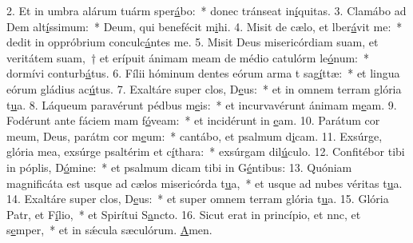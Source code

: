 2. Et in umbra alárum tuárm sper\uline{á}bo:~* donec tránseat in\uline{í}quitas.
3. Clamábo ad Dem alt\uline{í}ssimum:~* Deum, qui benefécit m\uline{i}hi.
4. Misit de cælo, et lber\uline{á}vit me:~* dedit in oppróbrium conculc\uline{á}ntes me.
5. Misit Deus misericórdiam suam, et veritátem suam,~† et erípuit ánimam meam de médio catulórm le\uline{ó}num:~* dormívi conturb\uline{á}tus.
6. Fílii hóminum dentes eórum arma t sag\uline{í}ttæ:~* et lingua eórum gládius ac\uline{ú}tus.
7. Exaltáre super clos, D\uline{e}us:~* et in omnem terram glória t\uline{u}a.
8. Láqueum paravérunt pédbus m\uline{e}is:~* et incurvavérunt ánimam m\uline{e}am.
9. Fodérunt ante fáciem mam f\uline{ó}veam:~* et incidérunt in \uline{e}am.
10. Parátum cor meum, Deus, parátm cor m\uline{e}um:~* cantábo, et psalmum d\uline{i}cam.
11. Exsúrge, glória mea, exsúrge psaltérim et c\uline{í}thara:~* exsúrgam dil\uline{ú}culo.
12. Confitébor tibi in póplis, D\uline{ó}mine:~* et psalmum dicam tibi in G\uline{é}ntibus:
13. Quóniam magnificáta est usque ad cælos misericórda t\uline{u}a,~* et usque ad nubes véritas t\uline{u}a.
14. Exaltáre super clos, D\uline{e}us:~* et super omnem terram glória t\uline{u}a.
15. Glória Patr, et F\uline{í}lio,~* et Spirítui S\uline{a}ncto.
16. Sicut erat in princípio, et nnc, et s\uline{e}mper,~* et in sǽcula sæculórum. \uline{A}men.

